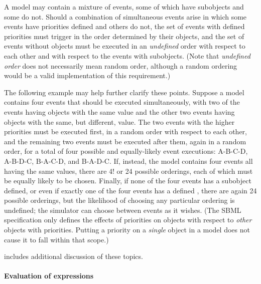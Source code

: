 A model may contain a mixture of events, some of which have
\Priority subobjects and some do not.  Should a combination of
simultaneous events arise in which some events have priorities
defined and others do not, the set of events with defined
priorities must trigger in the order determined by their \Priority
objects, and the set of events without \Priority objects must be
executed in an \emph{undefined} order with respect to each other
and with respect to the events with \Priority subobjects.  (Note
that \emph{undefined order} does not necessarily mean random
order, although a random ordering would be a valid implementation
of this requirement.)

The following example may help further clarify these points.
Suppose a model contains four events that should be executed
simultaneously, with two of the events having \Priority objects
with the same value and the other two events having \Priority
objects with the same, but different, value.  The two events with
the higher priorities must be executed first, in a random order
with respect to each other, and the remaining two events must be
executed after them, again in a random order, for a total of four
possible and equally-likely event executions: A-B-C-D, A-B-D-C,
B-A-C-D, and B-A-D-C.  If, instead, the model contains four events
all having the same \Priority values, there are 4! or 24
possible orderings, each of which must be equally likely to be
chosen.  Finally, if none of the four events has a \Priority
subobject defined, or even if exactly one of the four events has a
defined \Priority, there are again 24 possible orderings, but the
likelihood of choosing any particular ordering is undefined; the
simulator can choose between events as it wishes.  (The SBML
specification only defines the effects of priorities on \Event
objects with respect to \emph{other} \Event objects with
priorities.  Putting a priority on a \emph{single} \Event object
in a model does not cause it to fall within that scope.)

 includes additional discussion
of these topics.


\paragraph{Evaluation of  expressions}


